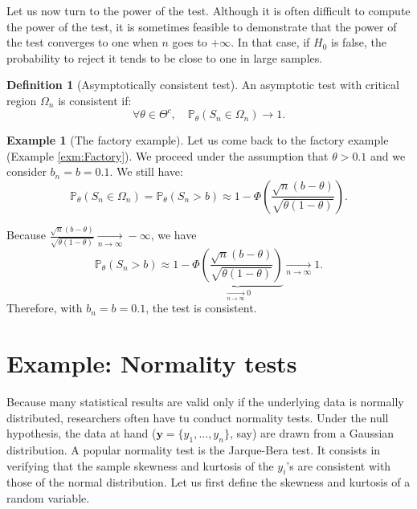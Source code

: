 \documentclass[
  12pt,
]{book}
\theoremstyle{definition}
\newtheorem{definition}{Definition}[chapter]
\theoremstyle{definition}
\newtheorem{example}{Example}[chapter]
\theoremstyle{definition}
\theoremstyle{definition}
\theoremstyle{remark}
\begin{document}
Let us now turn to the power of the test. Although it is often difficult to compute the power of the test, it is sometimes feasible to demonstrate that the power of the test converges to one when \(n\) goes to \(+\infty\). In that case, if \(H_0\) is false, the probability to reject it tends to be close to one in large samples.

\begin{definition}[Asymptotically consistent test]
\protect\hypertarget{def:asmyptconsisttest}{}\label{def:asmyptconsisttest}An asymptotic test with critical region \(\Omega_n\) is consistent if:
\[
\forall \theta \in \Theta^c, \quad \mathbb{P}_\theta (S_n \in \Omega_n) \rightarrow 1.
\]
\end{definition}

\begin{example}[The factory example]
\protect\hypertarget{exm:FactAsymptConsist}{}\label{exm:FactAsymptConsist}Let us come back to the factory example (Example \ref{exm:Factory}). We proceed under the assumption that \(\theta>0.1\) and we consider \(b_n = b = 0.1\). We still have:
\[
\mathbb{P}_\theta (S_n \in \Omega_n)=\mathbb{P}_\theta (S_n > b) \approx 1-\Phi\left(\frac{\sqrt{n}(b-\theta)}{\sqrt{\theta(1-\theta)}}\right).
\]

Because \(\frac{\sqrt{n}(b-\theta)}{\sqrt{\theta(1-\theta)}} \underset{n \rightarrow \infty}{\rightarrow} -\infty\), we have
\[
\mathbb{P}_\theta (S_n > b) \approx 1- \underbrace{\Phi\left(\frac{\sqrt{n}(b-\theta)}{\sqrt{\theta(1-\theta)}}\right)}_{\underset{n \rightarrow \infty}{\rightarrow} 0} \underset{n \rightarrow \infty}{\rightarrow} 1.
\]
Therefore, with \(b_n=b=0.1\), the test is consistent.
\end{example}

\hypertarget{example-normality-tests}{%
\section{Example: Normality tests}\label{example-normality-tests}}

Because many statistical results are valid only if the underlying data is normally distributed, researchers often have tu conduct normality tests. Under the null hypothesis, the data at hand (\(\mathbf{y}=\{y_1,\dots,y_n\}\), say) are drawn from a Gaussian distribution. A popular normality test is the Jarque-Bera test. It consists in verifying that the sample skewness and kurtosis of the \(y_i\)'s are consistent with those of the normal distribution. Let us first define the skewness and kurtosis of a random variable.
\end{document}
